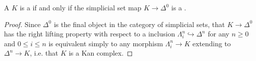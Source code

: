 \begin{lemma} \label{lemma:simplicial_set_is_kan_complex_iff_simplicial_set_map_to_final_simplicial_set_is_a_kan_fibration}
    A  $K$ is a  if and only if the simplicial set map $K \to \Delta^0$ is a .
\end{lemma}
\begin{proof}
    Since $\Delta^0$ is the final object in the category of simplicial sets, that $K \to \Delta^0$ has the right lifting property with respect to a  inclusion $\Lambda_i^n \hookrightarrow \Delta^n$ for any $n \geq 0$ and $0 \leq i \leq n$ is equivalent simply to any morphism $\Lambda_i^n \to K$ extending to $\Delta^n \to K$, i.e. that $K$ is a Kan complex.
\end{proof}